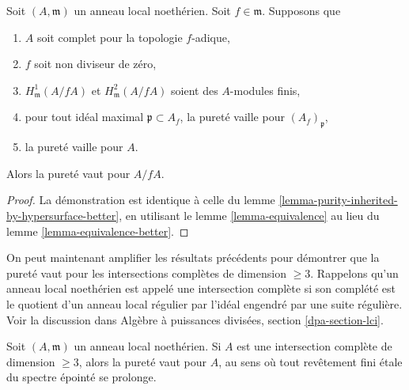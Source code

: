 \begin{lemma}
\label{lemma-purity-inherited-by-hypersurface}
Soit $(A, \mathfrak m)$ un anneau local noethérien.
Soit $f \in \mathfrak m$. Supposons que
\begin{enumerate}
\item $A$ soit complet pour la topologie $f$-adique,
\item $f$ soit non diviseur de zéro,
\item $H^1_\mathfrak m(A/fA)$ et $H^2_\mathfrak m(A/fA)$ soient des
$A$-modules finis,
\item pour tout idéal maximal $\mathfrak p \subset A_f$,
la pureté vaille pour $(A_f)_\mathfrak p$,
\item la pureté vaille pour $A$.
\end{enumerate}
Alors la pureté vaut pour $A/fA$.
\end{lemma}

\begin{proof}
La démonstration est identique à celle du
lemme \ref{lemma-purity-inherited-by-hypersurface-better},
en utilisant le
lemme \ref{lemma-equivalence}
au lieu du
lemme \ref{lemma-equivalence-better}.
\end{proof}

\noindent
On peut maintenant amplifier les résultats précédents pour démontrer que
la pureté vaut pour les intersections complètes de dimension $\geq 3$.
Rappelons qu'un anneau local noethérien est appelé une intersection
complète si son complété est le quotient d'un
anneau local régulier par l'idéal engendré par une suite régulière.
Voir la discussion dans Algèbre à puissances divisées, section \ref{dpa-section-lci}.

\begin{proposition}
\label{proposition-purity-complete-intersection}
Soit $(A, \mathfrak m)$ un anneau local noethérien. Si $A$ est une
intersection complète de dimension $\geq 3$, alors la pureté
vaut pour $A$, au sens où tout revêtement fini étale du
spectre épointé se prolonge.
\end{proposition}

